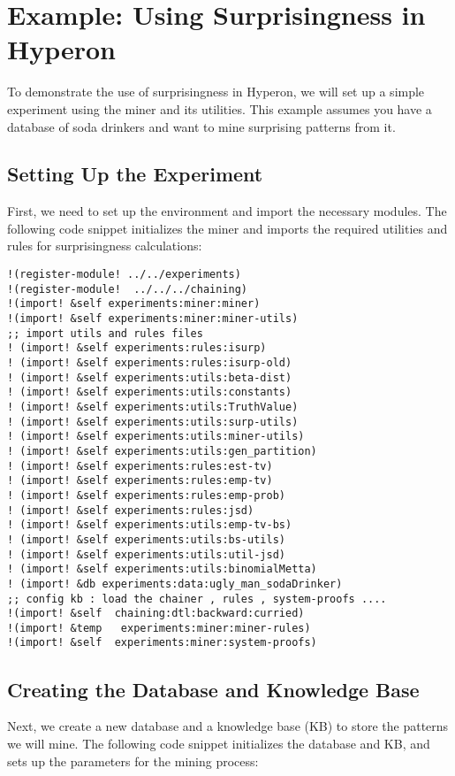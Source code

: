 \documentclass{article}
\begin{document}
\section{Example: Using Surprisingness in Hyperon} 
To demonstrate the use of surprisingness in Hyperon, we will set up a simple experiment using the miner and its utilities. This example assumes you have a database of soda drinkers
and want to mine surprising patterns from it.
\subsection{Setting Up the Experiment}
First, we need to set up the environment and import the necessary modules. The following code snippet initializes the miner and imports the required utilities and rules for surprisingness calculations:

\begin{verbatim}
!(register-module! ../../experiments)
!(register-module!  ../../../chaining)
!(import! &self experiments:miner:miner)
!(import! &self experiments:miner:miner-utils)
;; import utils and rules files 
! (import! &self experiments:rules:isurp)
! (import! &self experiments:rules:isurp-old)
! (import! &self experiments:utils:beta-dist)
! (import! &self experiments:utils:constants)
! (import! &self experiments:utils:TruthValue)
! (import! &self experiments:utils:surp-utils)
! (import! &self experiments:utils:miner-utils)
! (import! &self experiments:utils:gen_partition)
! (import! &self experiments:rules:est-tv)
! (import! &self experiments:rules:emp-tv)
! (import! &self experiments:rules:emp-prob)
! (import! &self experiments:rules:jsd)
! (import! &self experiments:utils:emp-tv-bs)
! (import! &self experiments:utils:bs-utils)
! (import! &self experiments:utils:util-jsd)
! (import! &self experiments:utils:binomialMetta)
! (import! &db experiments:data:ugly_man_sodaDrinker)
;; config kb : load the chainer , rules , system-proofs ....
!(import! &self  chaining:dtl:backward:curried)
!(import! &temp   experiments:miner:miner-rules)
!(import! &self  experiments:miner:system-proofs)
\end{verbatim}


\subsection{Creating the Database and Knowledge Base}
Next, we create a new database and a knowledge base (KB) to store the patterns we will mine. The following code snippet initializes the database and KB, and sets up the parameters for the mining process:
\end{document}

